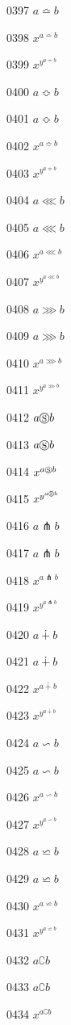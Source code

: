 \documentclass{article}
\begin{document}
0397 $\displaystyle a\bumpeq b$\par
0398 $x^{a\bumpeq b}$\par
0399 $x^{y^{a\bumpeq b}}$\par
0400 $a\Bumpeq b$\par
0401 $\displaystyle a\Bumpeq b$\par
0402 $x^{a\Bumpeq b}$\par
0403 $x^{y^{a\Bumpeq b}}$\par
0404 $a\lll b$\par
0405 $\displaystyle a\lll b$\par
0406 $x^{a\lll b}$\par
0407 $x^{y^{a\lll b}}$\par
0408 $a\ggg b$\par
0409 $\displaystyle a\ggg b$\par
0410 $x^{a\ggg b}$\par
0411 $x^{y^{a\ggg b}}$\par
0412 $a\circledS b$\par
0413 $\displaystyle a\circledS b$\par
0414 $x^{a\circledS b}$\par
0415 $x^{y^{a\circledS b}}$\par
0416 $a\pitchfork b$\par
0417 $\displaystyle a\pitchfork b$\par
0418 $x^{a\pitchfork b}$\par
0419 $x^{y^{a\pitchfork b}}$\par
0420 $a\dotplus b$\par
0421 $\displaystyle a\dotplus b$\par
0422 $x^{a\dotplus b}$\par
0423 $x^{y^{a\dotplus b}}$\par
0424 $a\backsim b$\par
0425 $\displaystyle a\backsim b$\par
0426 $x^{a\backsim b}$\par
0427 $x^{y^{a\backsim b}}$\par
0428 $a\backsimeq b$\par
0429 $\displaystyle a\backsimeq b$\par
0430 $x^{a\backsimeq b}$\par
0431 $x^{y^{a\backsimeq b}}$\par
0432 $a\complement b$\par
0433 $\displaystyle a\complement b$\par
0434 $x^{a\complement b}$\par
\end{document}
